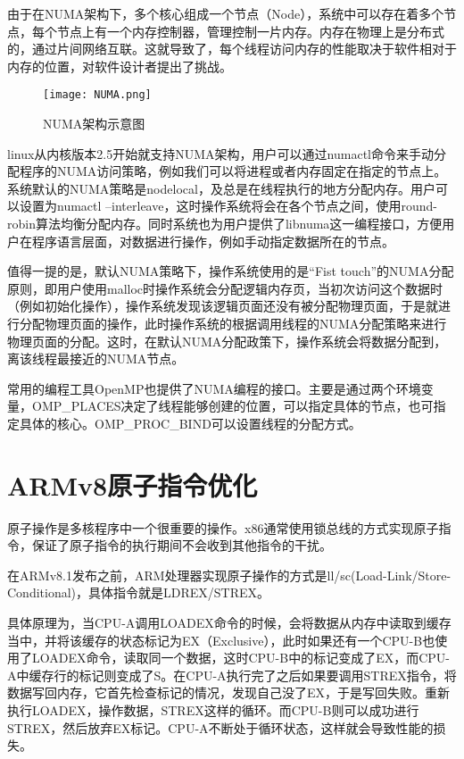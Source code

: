 由于在NUMA架构下，多个核心组成一个节点（Node），系统中可以存在着多个节点，每个节点上有一个内存控制器，管理控制一片内存。内存在物理上是分布式的，通过片间网络互联。这就导致了，每个线程访问内存的性能取决于软件相对于内存的位置，对软件设计者提出了挑战。

\begin{figure}[htbp]
    \centering
    \texttt{[image: NUMA.png]}
    \caption{NUMA架构示意图}
    \label{NUMA架构示意图}
\end{figure}

linux从内核版本2.5开始就支持NUMA架构\cite{numalinux}，用户可以通过numactl命令来手动分配程序的NUMA访问策略，例如我们可以将进程或者内存固定在指定的节点上。系统默认的NUMA策略是nodelocal，及总是在线程执行的地方分配内存。用户可以设置为numactl --interleave，这时操作系统将会在各个节点之间，使用round-robin算法均衡分配内存。同时系统也为用户提供了libnuma这一编程接口\cite{libnuma}，方便用户在程序语言层面，对数据进行操作，例如手动指定数据所在的节点。

值得一提的是，默认NUMA策略下，操作系统使用的是“Fist touch”的NUMA分配原则，即用户使用malloc时操作系统会分配逻辑内存页，当初次访问这个数据时（例如初始化操作），操作系统发现该逻辑页面还没有被分配物理页面，于是就进行分配物理页面的操作，此时操作系统的根据调用线程的NUMA分配策略来进行物理页面的分配。这时，在默认NUMA分配政策下，操作系统会将数据分配到，离该线程最接近的NUMA节点。

常用的编程工具OpenMP也提供了NUMA编程的接口。主要是通过两个环境变量，OMP\_PLACES决定了线程能够创建的位置，可以指定具体的节点，也可指定具体的核心。OMP\_PROC\_BIND可以设置线程的分配方式。

\section{ARMv8原子指令优化}

原子操作是多核程序中一个很重要的操作。x86通常使用锁总线的方式实现原子指令，保证了原子指令的执行期间不会收到其他指令的干扰。

在ARMv8.1发布之前，ARM处理器实现原子操作的方式是ll/sc(Load-Link/Store-Conditional)，具体指令就是LDREX/STREX。

具体原理为，当CPU-A调用LOADEX命令的时候，会将数据从内存中读取到缓存当中，并将该缓存的状态标记为EX（Exclusive），此时如果还有一个CPU-B也使用了LOADEX命令，读取同一个数据，这时CPU-B中的标记变成了EX，而CPU-A中缓存行的标记则变成了S。在CPU-A执行完了之后如果要调用STREX指令，将数据写回内存，它首先检查标记的情况，发现自己没了EX，于是写回失败。重新执行LOADEX，操作数据，STREX这样的循环。而CPU-B则可以成功进行STREX，然后放弃EX标记。CPU-A不断处于循环状态，这样就会导致性能的损失。

